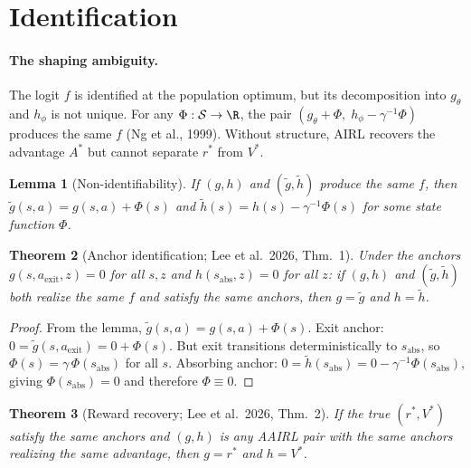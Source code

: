 \documentclass[11pt]{article}
\newtheorem{theorem}{Theorem}
\newtheorem{lemma}[theorem]{Lemma}
\begin{document}
\section{Identification}

\paragraph{The shaping ambiguity.} The logit $f$ is identified at the population optimum, but its decomposition into $g_\theta$ and $h_\phi$ is not unique. For any $\Phi: \mathcal{S} \to \R$, the pair $(g_\theta + \Phi,\; h_\phi - \gamma^{-1}\Phi)$ produces the same $f$ (Ng et al., 1999). Without structure, AIRL recovers the advantage $A^*$ but cannot separate $r^*$ from $V^*$.

\begin{lemma}[Non-identifiability]
If $(g,h)$ and $(\tilde{g}, \tilde{h})$ produce the same $f$, then $\tilde{g}(s,a) = g(s,a) + \Phi(s)$ and $\tilde{h}(s) = h(s) - \gamma^{-1}\Phi(s)$ for some state function $\Phi$.
\end{lemma}

\begin{theorem}[Anchor identification; Lee et al.\ 2026, Thm.\ 1]
\label{thm:anchor}
Under the anchors $g(s, a_{\text{exit}}, z) = 0$ for all $s, z$ and $h(s_{\text{abs}}, z) = 0$ for all $z$: if $(g,h)$ and $(\tilde{g}, \tilde{h})$ both realize the same $f$ and satisfy the same anchors, then $g = \tilde{g}$ and $h = \tilde{h}$.
\end{theorem}

\begin{proof}
From the lemma, $\tilde{g}(s,a) = g(s,a) + \Phi(s)$. Exit anchor: $0 = \tilde{g}(s,a_{\text{exit}}) = 0 + \Phi(s)$. But exit transitions deterministically to $s_{\text{abs}}$, so $\Phi(s) = \gamma\,\Phi(s_{\text{abs}})$ for all $s$. Absorbing anchor: $0 = \tilde{h}(s_{\text{abs}}) = 0 - \gamma^{-1}\Phi(s_{\text{abs}})$, giving $\Phi(s_{\text{abs}}) = 0$ and therefore $\Phi \equiv 0$.
\end{proof}

\begin{theorem}[Reward recovery; Lee et al.\ 2026, Thm.\ 2]
If the true $(r^*, V^*)$ satisfy the same anchors and $(g,h)$ is any AAIRL pair with the same anchors realizing the same advantage, then $g = r^*$ and $h = V^*$.
\end{theorem}
\end{document}
